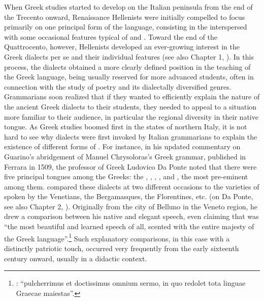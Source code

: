 When Greek studies started to develop on the Italian peninsula from the end of the Trecento onward, Renaissance Hellenists were initially compelled to focus primarily on one principal form of the language, consisting in the  interspersed with some occasional features typical of  and . Toward the end of the Quattrocento, however, Hellenists developed an ever-growing interest in the Greek dialects per se and their individual features (see also Chapter 1, ). In this process, the dialects obtained a more clearly defined position in the teaching of the Greek language, being usually reserved for more advanced students, often in connection with the study of poetry and its dialectally diversified genres. Grammarians soon realized that if they wanted to efficiently explain the nature of the ancient Greek dialects to their students, they needed to appeal to a situation more familiar to their audience, in particular the regional diversity in their native  tongue. As Greek studies boomed first in the states of northern Italy, it is not hard to see why  dialects were first invoked by Italian grammarians to explain the existence of different forms of . For instance, in his updated commentary on Guarino’s abridgement of Manuel Chrysoloras’s Greek grammar, published in Ferrara in 1509, the professor of Greek Ludovico Da Ponte noted that there were five principal tongues among the Greeks: the , , , , and , the most pre-eminent among them.  compared these dialects at two different occasions to the varieties of  spoken by the Venetians, the Bergamasques, the Florentines, etc. (on Da Ponte, see also Chapter 2, ). Originally from the city of Belluno in the Veneto region, he drew a comparison between his native  and elegant  speech, even claiming that  was “the most beautiful and learned speech of all, scented with the entire majesty of the Greek language”.\footnote{: “pulcherrimus et doctissimus omnium sermo, in quo redolet tota linguae Graecae maiestas”.} Such explanatory comparisons, in this case with a distinctly patriotic touch, occurred very frequently from the early sixteenth century onward, usually in a didactic context.

